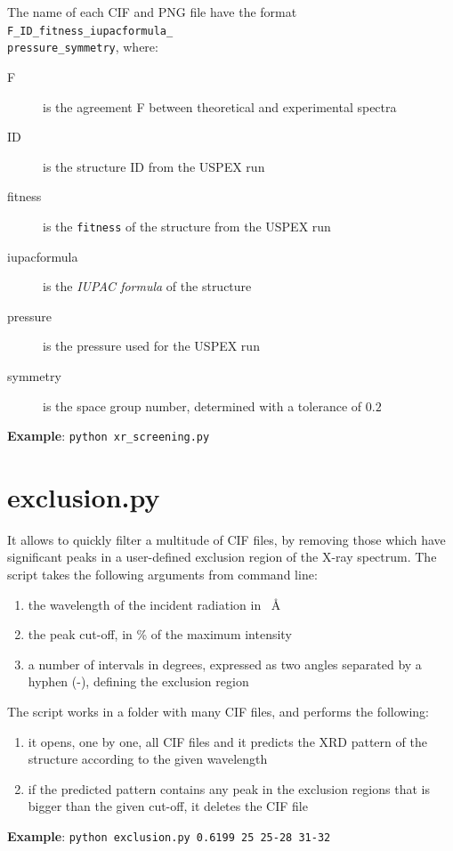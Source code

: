 \documentclass{article}
\begin{document}
The name of each CIF and PNG file have the format \texttt{F\_ID\_fitness\_iupacformula\_ \\ pressure\_symmetry}, where:
\begin{description}
	\item[F] is the agreement F between theoretical and experimental spectra
	\item[ID] is the structure ID from the USPEX run
	\item[fitness] is the \texttt{fitness} of the structure from the USPEX run
	\item[iupacformula] is the \emph{IUPAC formula} of the structure
	\item[pressure] is the pressure used for the USPEX run
	\item[symmetry] is the space group number, determined with a tolerance of $0.2$
\end{description}
\textbf{Example}: \texttt{python xr\_screening.py}

\section{exclusion.py}
It allows to quickly filter a multitude of CIF files, by removing those which have significant peaks in a user-defined exclusion region of the X-ray spectrum. The script takes the following arguments from command line:
\begin{enumerate}
	\item the wavelength of the incident radiation in \SI{}{\angstrom}
	\item the peak cut-off, in \% of the maximum intensity
	\item a number of intervals in degrees, expressed as two angles separated by a hyphen (-), defining the exclusion region
\end{enumerate}
The script works in a folder with many CIF files, and performs the following:
\begin{enumerate}
	\item it opens, one by one, all CIF files and it predicts the XRD pattern of the structure according to the given wavelength
	\item if the predicted pattern contains any peak in the exclusion regions that is bigger than the given cut-off, it deletes the CIF file
\end{enumerate}
\textbf{Example}: \texttt{python exclusion.py 0.6199 25 25-28 31-32}
\end{document}
